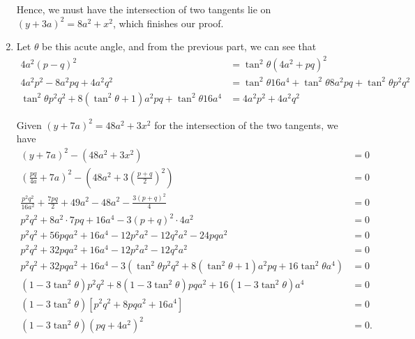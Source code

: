 \begin{enumerate}
          Hence, we must have the intersection of two tangents lie on \((y + 3a)^2 = 8a^2 + x^2\), which finishes our proof.

    \item Let \(\theta\) be this acute angle, and from the previous part, we can see that
          \begin{align*}
              4a^2 (p - q)^2                                                            & = \tan^2 \theta (4a^2 + pq)^2                                          \\
              4a^2 p^2 - 8 a^2 pq + 4 a^2 q^2                                           & = \tan^2 \theta 16a^4 + \tan^2 \theta 8 a^2 pq + \tan^2 \theta p^2 q^2 \\
              \tan^2\theta p^2 q^2 + 8(\tan^2 \theta + 1) a^2 pq + \tan^2 \theta 16 a^4 & = 4a^2 p^2 + 4 a^2 q^2
          \end{align*}

          Given \((y + 7a)^2 = 48 a^2 +3x^2\) for the intersection of the two tangents, we have
          \begin{align*}
              (y + 7a)^2 - \left(48 a^2 +3x^2\right)                                                                                  & = 0  \\
              \left(\frac{pq}{4a} + 7a\right)^2 - \left(48 a^2 + 3 \left(\frac{p + q}{2}\right)^2\right)                              & = 0  \\
              \frac{p^2 q^2}{16 a^2} + \frac{7pq}{2} + 49 a^2 - 48a^2 - \frac{3 (p + q)^2}{4}                                         & = 0  \\
              p^2 q^2 + 8 a^2 \cdot 7pq + 16 a^4 - 3 (p + q)^2 \cdot 4 a^2                                                            & = 0  \\
              p^2 q^2 + 56 pq a^2 + 16 a^4 - 12 p^2 a^2 - 12 q^2 a^2 - 24 pq a^2                                                      & = 0  \\
              p^2 q^2 + 32 pq a^2 + 16 a^4 - 12 p^2 a^2 - 12 q^2 a^2                                                                  & = 0  \\
              p^2 q^2 + 32 pq a^2 + 16 a^4 - 3 \left(\tan^2\theta p^2 q^2 + 8(\tan^2 \theta + 1) a^2 pq + 16 \tan^2 \theta a^4\right) & = 0  \\
              (1 - 3 \tan^2 \theta) p^2 q^2 + 8 (1 - 3 \tan^2 \theta) pq a^2 + 16 (1 - 3 \tan^2 \theta) a^4                           & = 0  \\
              (1 - 3 \tan^2 \theta) \left[p^2 q^2 + 8 pq a^2 + 16 a^4\right]                                                          & = 0  \\
              (1 - 3 \tan^2 \theta) (pq + 4a^2)^2                                                                                     & = 0.
          \end{align*}


\end{enumerate}
